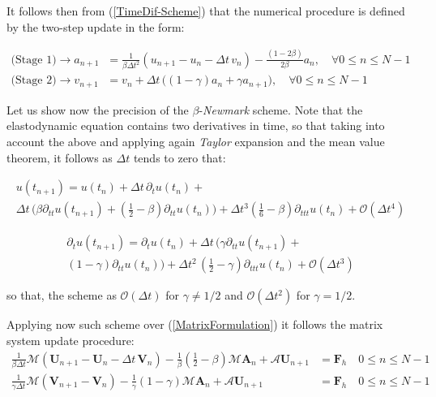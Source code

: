 It follows then from (\ref{TimeDif-Scheme}) that the numerical procedure is defined by the two-step update in the form:

\begin{align}
    \label{TwoStage-Update}
    \text{(Stage 1)}\longrightarrow  a_{n+1} &= \frac{1}{\beta \Delta t^2} ( u_{n+1}-u_n - \Delta t \, v_n) - \frac{(1-2\beta)}{2 \beta} a_n, \quad \forall 0 \leq n \leq N-1 \\
    \text{(Stage 2)}\longrightarrow v_{n+1} &= v_n + \Delta t \, \big( (1-\gamma) a_n + \gamma a_{n+1} \big), \quad \forall 0 \leq n \leq N-1
\end{align}

Let us show now the precision of the $\beta$-\textit{Newmark} scheme. Note that the elastodynamic equation contains two derivatives in time, so that taking into account the above and applying again \textit{Taylor} expansion and the mean value theorem, it follows as $\Delta t$ tends to zero that:

\begin{multline}
    u(t_{n+1}) = u(t_{n}) + \Delta t \, \partial_{t} u(t_n) + \\
    \Delta t \, \big( \beta \partial_{tt} u(t_{n+1}) + (\frac{1}{2}- \beta) \partial_{tt} u(t_n) \big) + \Delta t^3 (\frac{1}{6}-\beta) \partial_{ttt}u(t_n) + \mathcal{O}(\Delta t^4)
\end{multline}

\begin{multline}
    \partial_{t} u(t_{n+1}) = \partial_{t} u(t_n) + \Delta t\, \big( \gamma \partial_{tt} u(t_{n+1}) + \\
    (1-\gamma) \partial_{tt}u(t_n) \big) + \Delta t^2 \, (\frac{1}{2}-\gamma) \partial_{ttt} u(t_n) + \mathcal{O}(\Delta t^3)
\end{multline}

so that, the scheme as $\mathcal{O}(\Delta t)$ for $\gamma \neq 1/2$ and $\mathcal{O}(\Delta t^2)$ for $\gamma = 1/2$.

Applying now such scheme over (\ref{MatrixFormulation}) it follows the matrix system update procedure:
\begin{align}
    \label{MatrixSystemUpdate}
    \frac{1}{\beta \Delta t} \mathcal{M}(\mathbf{U}_{n+1} - \mathbf{U}_{n} - \Delta t\, \mathbf{V}_n) - \frac{1}{\beta}(\frac{1}{2}- \beta) \mathcal{M}\mathbf{A}_n + \mathcal{A}\mathbf{U}_{n+1} &= \mathbf{F}_h \quad 0 \leq n \leq N-1 \\
    \frac{1}{\gamma \Delta t} \mathcal{M}(\mathbf{V}_{n+1} - \mathbf{V}_{n}) - \frac{1}{\gamma}(1-\gamma) \mathcal{M}\mathbf{A}_n + \mathcal{A}\mathbf{U}_{n+1} & = \mathbf{F}_h \quad 0 \leq n \leq N-1
\end{align}

